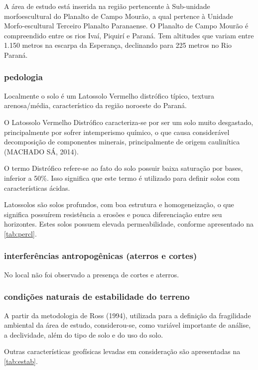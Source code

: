 A área de estudo está inserida na região pertencente à Sub-unidade morfoescultural do Planalto de Campo Mourão, a qual pertence à Unidade Morfo-escultural Terceiro Planalto Paranaense.
O Planalto de Campo Mourão é compreendido entre os rios Ivaí, Piquirí e Paraná. Tem altitudes que variam entre 1.150 metros na escarpa da Esperança, declinando para 225 metros no Rio Paraná.



\subsubsection{pedologia}
Localmente o solo é um Latossolo Vermelho distrófico
típico, textura arenosa/média, característico da região noroeste do Paraná.

O Latossolo Vermelho Distrófico caracteriza-se por ser um solo muito desgastado, principalmente por sofrer intemperismo químico, o que causa considerável decomposição de componentes minerais, principalmente de origem
caulinítica (MACHADO SÁ, 2014).

O termo Distrófico refere-se ao fato do solo possuir baixa saturação por
bases, inferior a 50\%. Isso significa que este termo é utilizado para definir solos com
características ácidas.

Latossolos são solos profundos, com
boa estrutura e homogeneização, o que significa possuírem resistência a erosões e
pouca diferenciação entre seu horizontes. Estes solos possuem elevada
permeabilidade, conforme apresentado 
na \cref{tab:percl}.

\subsubsection{interferências antropogênicas (aterros e cortes)}

No local não foi observado a presença de cortes e aterros.

\subsubsection{condições naturais de estabilidade do terreno}

A partir da metodologia de Ross (1994), utilizada para a
definição da fragilidade ambiental da área de estudo,
considerou-se, como variável importante de análise,
a declividade, além do tipo de solo e do uso do solo.

Outras características geofísicas levadas em consideração
são apresentadas na \cref{tab:estab}.

